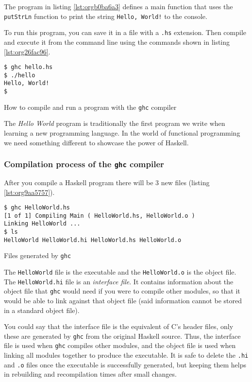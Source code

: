 \documentclass[a4paper, titlepage, twoside]{article}
\begin{document}
The program in listing \ref{lst:orgb0ba6a3} defines a main function that uses the \texttt{putStrLn} function to print the string \texttt{Hello, World!} to the console.

To run this program, you can save it in a file with a \texttt{.hs} extension. Then compile and execute it from the command line using the commands shown in listing \ref{lst:org26fac96}.

\begin{listing}[htbp]
\begin{verbatim}
$ ghc hello.hs
$ ./hello
Hello, World!
$
\end{verbatim}
\caption{\label{lst:org26fac96}How to compile and run a program with the \texttt{ghc} compiler}
\end{listing}

The \emph{Hello World} program is traditionally the first program we write when learning a new programming language. In the world of functional programming we need something different to showcase the power of Haskell.

\subsubsection{Compilation process of the \texttt{ghc} compiler}
\label{sec:orgbc87fe6}

After you compile a Haskell program there will be 3 new files (listing \ref{lst:org9aa5757}).

\begin{listing}[htbp]
\begin{verbatim}
$ ghc HelloWorld.hs
[1 of 1] Compiling Main ( HelloWorld.hs, HelloWorld.o )
Linking HelloWorld ...
$ ls
HelloWorld HelloWorld.hi HelloWorld.hs HelloWorld.o
\end{verbatim}
\caption{\label{lst:org9aa5757}Files generated by \texttt{ghc}}
\end{listing}

The \texttt{HelloWorld} file is the executable and the \texttt{HelloWorld.o} is the object file. The \texttt{HelloWorld.hi} file is an \emph{interface file}. It contains information about the object file that \texttt{ghc} would need if you were to compile other modules, so that it would be able to link against that object file (said information cannot be stored in a standard object file).

You could say that the interface file is the equivalent of C's header files, only these are generated by \texttt{ghc} from the original Haskell source. Thus, the interface file is used when \texttt{ghc} compiles other modules, and the object file is used when linking all modules together to produce the executable. It is safe to delete the \texttt{.hi} and \texttt{.o} files once the executable is successfully generated, but keeping them helps in rebuilding and recompilation times after small changes.
\end{document}
